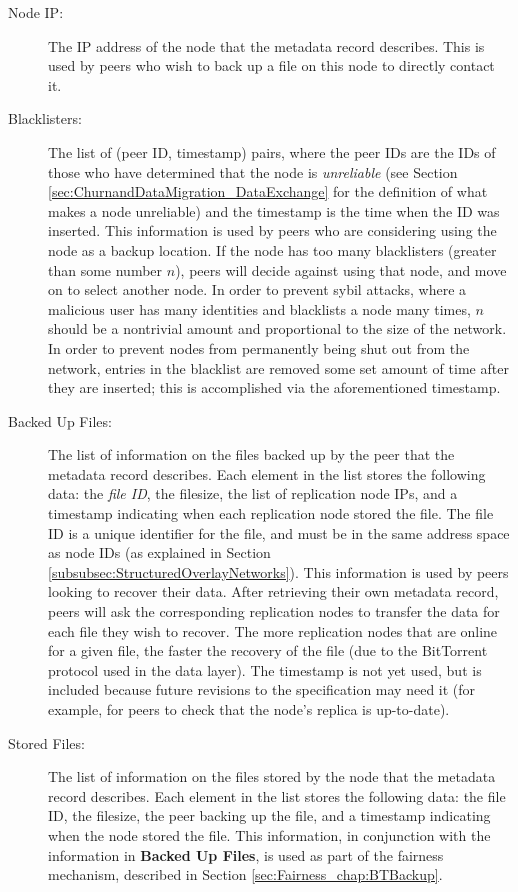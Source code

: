 \documentclass[12pt]{report}
\begin{document}
\begin{description}
  \item[Node IP:] The IP address of the node that the metadata record describes. This is used by peers who wish to back up a file on this node to directly contact it.
  \item[Blacklisters:] The list of (peer ID, timestamp) pairs, where the peer IDs are the IDs of those who have determined that the node is \textit{unreliable} (see Section \ref{sec:ChurnandDataMigration_DataExchange} for the definition of what makes a node unreliable) and the timestamp is the time when the ID was inserted. This information is used by peers who are considering using the node as a backup location. If the node has too many blacklisters (greater than some number $n$), peers will decide against using that node, and move on to select another node. In order to prevent sybil attacks, where a malicious user has many identities and blacklists a node many times, $n$ should be a nontrivial amount and proportional to the size of the network. In order to prevent nodes from permanently being shut out from the network, entries in the blacklist are removed some set amount of time after they are inserted; this is accomplished via the aforementioned timestamp.
  \item[Backed Up Files:] The list of information on the files backed up by the peer that the metadata record describes. Each element in the list stores the following data: the \textit{file ID}, the filesize, the list of replication node IPs, and a timestamp indicating when each replication node stored the file. The file ID is a unique identifier for the file, and must be in the same address space as node IDs (as explained in Section \ref{subsubsec:StructuredOverlayNetworks}). This information is used by peers looking to recover their data. After retrieving their own metadata record, peers will ask the corresponding replication nodes to transfer the data for each file they wish to recover. The more replication nodes that are online for a given file, the faster the recovery of the file (due to the BitTorrent protocol used in the data layer). The timestamp is not yet used, but is included because future revisions to the specification may need it (for example, for peers to check that the node's replica is up-to-date).
  \item[Stored Files:] The list of information on the files stored by the node that the metadata record describes. Each element in the list stores the following data: the file ID, the filesize, the peer backing up the file, and a timestamp indicating when the node stored the file. This information, in conjunction with the information in \textbf{Backed Up Files}, is used as part of the fairness mechanism, described in Section \ref{sec:Fairness_chap:BTBackup}.
\end{description}
\end{document}
